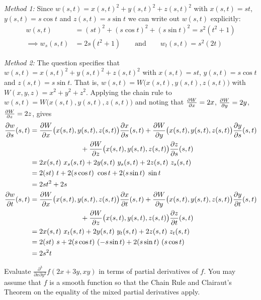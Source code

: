 \begin{solution}
\emph{Method 1:}
Since $w(s,t)=x(s,t)^2+y(s,t)^2+z(s,t)^2$ with $x(s,t)=st$, 
$y(s,t)=s\cos t$ and $z(s,t)=s\sin t$ we can write out $w(s,t)$
explicitly:
\begin{align*}
w(s,t)&=(st)^2+(s\cos t)^2+(s\sin t)^2
      =s^2(t^2+1)\\
\implies w_s(s,t)&=2s(t^2+1)\qquad\text{and}\qquad
  w_t(s,t)=s^2(2t)
\end{align*}

\emph{ Method 2:}
The question specifies that $w(s,t)=x(s,t)^2+y(s,t)^2+z(s,t)^2$ with 
$x(s,t)=st$, $y(s,t)=s\cos t$ and $z(s,t)=s\sin t$. That is, 
$w(s,t) = W\big(x(s,t), y(s,t), z(s,t)\big)$
with $W(x,y,z)= x^2+y^2+z^2$. Applying the chain rule to $w(s,t) = W\big(x(s,t), y(s,t), z(s,t)\big)$ and noting that $\pdiff{W}{x}=2x$,
$\pdiff{W}{y}=2y$, $\pdiff{W}{z}=2z$, gives
\begin{align*}
 \pdiff{w}{s}(s,t)
 &= \pdiff{W}{x}\big(x(s,t), y(s,t), z(s,t)\big)\pdiff{x}{s}(s,t)
   + \pdiff{W}{y}\big(x(s,t), y(s,t), z(s,t)\big)\pdiff{y}{s}(s,t)\\&\hskip1in
   + \pdiff{W}{z}\big(x(s,t), y(s,t), z(s,t)\big)\pdiff{z}{s}(s,t) \\
 &=2 x(s,t)\ x_s(s,t)+2 y(s,t)\ y_s(s,t)+2 z(s,t)\ z_s(s,t) \\
                  &=2 (st)\ t+2 (s\cos t)\ \cos t+2 (s\sin t)\ \sin t\\
                 &=2 st^2+2 s\\
  \pdiff{w}{t}(s,t)
 &= \pdiff{W}{x}\big(x(s,t), y(s,t), z(s,t)\big)\pdiff{x}{t}(s,t)
   + \pdiff{W}{y}\big(x(s,t), y(s,t), z(s,t)\big)\pdiff{y}{t}(s,t)\\&\hskip1in
   + \pdiff{W}{z}\big(x(s,t), y(s,t), z(s,t)\big)\pdiff{z}{t}(s,t) \\
 &=2 x(s,t)\ x_t(s,t)+2 y(s,t)\ y_t(s,t)+2 z(s,t)\ z_t(s,t)\\
                 &=2 (st)\ s+2 (s\cos t)\ (-s\sin t)+2 (s\sin t)\ (s\cos t)\\
                 &=2 s^2t
\end{align*}
\end{solution}

\begin{question}
Evaluate
 $\frac{\partial^3}{\partial x\partial y^2}f(2x+3y,xy)$
in terms of partial derivatives of $f$. 
You may assume that $f$ is a smooth function so that the 
Chain Rule and Clairaut's Theorem on the equality of the mixed partial derivatives apply.
\end{question}

